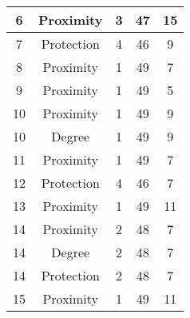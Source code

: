 \documentclass[results.tex]{subfiles}
\begin{document}
\begin{center}
\begin{tabular}{| c || c | c | c | c |}
            \hline
            6                       & Proximity                    & 3                      & 47                      & 15                   \\
            \hline
            7                       & Protection                   & 4                      & 46                      & 9                    \\
            \hline
            8                       & Proximity                    & 1                      & 49                      & 7                    \\
            \hline
            9                       & Proximity                    & 1                      & 49                      & 5                    \\
            \hline
            10                      & Proximity                    & 1                      & 49                      & 9                    \\
            \hline
            10                      & Degree                       & 1                      & 49                      & 9                    \\
            \hline
            11                      & Proximity                    & 1                      & 49                      & 7                    \\
            \hline
            12                      & Protection                   & 4                      & 46                      & 7                    \\
            \hline
            13                      & Proximity                    & 1                      & 49                      & 11                   \\
            \hline
            14                      & Proximity                    & 2                      & 48                      & 7                    \\
            \hline
            14                      & Degree                       & 2                      & 48                      & 7                    \\
            \hline
            14                      & Protection                   & 2                      & 48                      & 7                    \\
            \hline
            15                      & Proximity                    & 1                      & 49                      & 11                   \\

\end{tabular}
\end{center}
\end{document}
